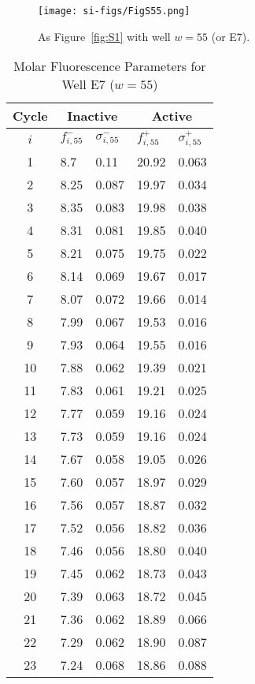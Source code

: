                 \begin{figure}
                    \centering
                    \texttt{[image: si-figs/FigS55.png]}
                    \caption{
                        As Figure~\ref{fig:S1} with well $w=55$ (or E7).
                    }
                \end{figure}
                \clearpage
    \begin{table}
        \caption{Molar Fluorescence Parameters for Well E7 ($w=55$)}
        \centering
        \begin{tabular}{c|ll|ll}
            Cycle & \multicolumn{2}{c|}{Inactive} & \multicolumn{2}{c}{Active} \\
            \hline
            $i$ & $f_{i,55}^{-}$ & $\sigma_{i,55}^{-}$ &  $f_{i,55}^{+}$ & $\sigma_{i,55}^{+}$ \\
            \hline
    1 & 8.7 & 0.11 & 20.92 & 0.063 \\
2 & 8.25 & 0.087 & 19.97 & 0.034 \\
3 & 8.35 & 0.083 & 19.98 & 0.038 \\
4 & 8.31 & 0.081 & 19.85 & 0.040 \\
5 & 8.21 & 0.075 & 19.75 & 0.022 \\
6 & 8.14 & 0.069 & 19.67 & 0.017 \\
7 & 8.07 & 0.072 & 19.66 & 0.014 \\
8 & 7.99 & 0.067 & 19.53 & 0.016 \\
9 & 7.93 & 0.064 & 19.55 & 0.016 \\
10 & 7.88 & 0.062 & 19.39 & 0.021 \\
11 & 7.83 & 0.061 & 19.21 & 0.025 \\
12 & 7.77 & 0.059 & 19.16 & 0.024 \\
13 & 7.73 & 0.059 & 19.16 & 0.024 \\
14 & 7.67 & 0.058 & 19.05 & 0.026 \\
15 & 7.60 & 0.057 & 18.97 & 0.029 \\
16 & 7.56 & 0.057 & 18.87 & 0.032 \\
17 & 7.52 & 0.056 & 18.82 & 0.036 \\
18 & 7.46 & 0.056 & 18.80 & 0.040 \\
19 & 7.45 & 0.062 & 18.73 & 0.043 \\
20 & 7.39 & 0.063 & 18.72 & 0.045 \\
21 & 7.36 & 0.062 & 18.89 & 0.066 \\
22 & 7.29 & 0.062 & 18.90 & 0.087 \\
23 & 7.24 & 0.068 & 18.86 & 0.088 \\

\end{tabular}
\end{table}
